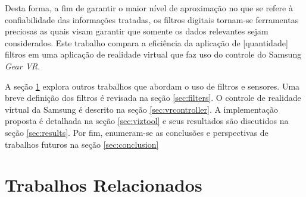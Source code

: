 \documentclass[conference]{IEEEtran}
\begin{document}
Desta forma, a fim de garantir o maior nível de aproximação no que se refere à confiabilidade das informações tratadas, os filtros digitais tornam-se ferramentas preciosas as quais visam garantir que somente os dados relevantes sejam considerados. Este trabalho compara a eficiência da aplicação de [quantidade] filtros em uma aplicação de realidade virtual que faz uso do controle do Samsung \textit{Gear VR}.

A seção \ref{sec:relatedworks} explora outros trabalhos que abordam o uso de filtros e sensores. Uma breve definição dos filtros é revisada na seção \ref{sec:filters}. O controle de realidade virtual da Samsung é descrito na seção \ref{sec:vrcontroller}. A implementação proposta é detalhada na seção \ref{sec:viztool} e seus resultados são discutidos na seção \ref{sec:results}. Por fim, enumeram-se as conclusões e perspectivas de trabalhos futuros na seção \ref{sec:conclusion}


\section{Trabalhos Relacionados} \label{sec:relatedworks}
\end{document}
